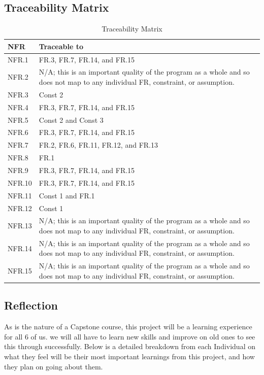 \documentclass[12pt]{article}
\begin{document}
\subsection{Traceability Matrix}

\begin{table}[H]
\caption{Traceability Matrix} \label{TblTraceabilityMatrix}
\begin{tabular}{p{}|p{}|}
\toprule
\textbf{NFR} & \textbf{Traceable to}\\
\midrule
NFR.1 & FR.3, FR.7, FR.14, and FR.15\\
\midrule
NFR.2 & N/A; this is an important quality of the program as a whole and so does not map to any individual FR, constraint, or assumption.\\
\midrule
NFR.3 & Const 2\\
\midrule
NFR.4 & FR.3, FR.7, FR.14, and FR.15\\
\midrule
NFR.5 & Const 2 and Const 3\\
\midrule
NFR.6 & FR.3, FR.7, FR.14, and FR.15\\
\midrule
NFR.7 & FR.2, FR.6, FR.11, FR.12, and FR.13\\
\midrule
NFR.8 & FR.1\\
\midrule
NFR.9 & FR.3, FR.7, FR.14, and FR.15\\
\midrule
NFR.10 & FR.3, FR.7, FR.14, and FR.15\\
\midrule
NFR.11 & Const 1 and FR.1\\
\midrule
NFR.12 & Const 1\\
\midrule
NFR.13 & N/A; this is an important quality of the program as a whole and so does not map to any individual FR, constraint, or assumption.\\
\midrule
NFR.14 & N/A; this is an important quality of the program as a whole and so does not map to any individual FR, constraint, or assumption.\\
\midrule
NFR.15 & N/A; this is an important quality of the program as a whole and so does not map to any individual FR, constraint, or assumption.\\
\bottomrule
\end{tabular}
\end{table}

\subsection{Reflection}

As is the nature of a Capstone course, this project will be a learning experience for all 6 of us. we will all have to learn new skills and improve on old ones to see this 
through successfully. Below is a detailed breakdown from each Individual on what they feel will be their most important learnings from this project, and how they plan on
going about them.
\end{document}
